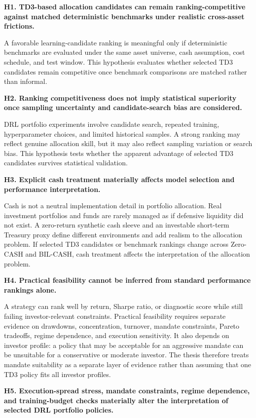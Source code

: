 \documentclass[12pt]{article}
\begin{document}
\textbf{H1. TD3-based allocation candidates can remain ranking-competitive against matched deterministic benchmarks under realistic cross-asset frictions.}

A favorable learning-candidate ranking is meaningful only if deterministic benchmarks are evaluated under the same asset universe, cash assumption, cost schedule, and test window. This hypothesis evaluates whether selected TD3 candidates remain competitive once benchmark comparisons are matched rather than informal.

\textbf{H2. Ranking competitiveness does not imply statistical superiority once sampling uncertainty and candidate-search bias are considered.}

DRL portfolio experiments involve candidate search, repeated training, hyperparameter choices, and limited historical samples. A strong ranking may reflect genuine allocation skill, but it may also reflect sampling variation or search bias. This hypothesis tests whether the apparent advantage of selected TD3 candidates survives statistical validation.

\textbf{H3. Explicit cash treatment materially affects model selection and performance interpretation.}

Cash is not a neutral implementation detail in portfolio allocation. Real investment portfolios and funds are rarely managed as if defensive liquidity did not exist. A zero-return synthetic cash sleeve and an investable short-term Treasury proxy define different environments and add realism to the allocation problem. If selected TD3 candidates or benchmark rankings change across Zero-CASH and BIL-CASH, cash treatment affects the interpretation of the allocation problem.

\textbf{H4. Practical feasibility cannot be inferred from standard performance rankings alone.}

A strategy can rank well by return, Sharpe ratio, or diagnostic score while still failing investor-relevant constraints. Practical feasibility requires separate evidence on drawdowns, concentration, turnover, mandate constraints, Pareto tradeoffs, regime dependence, and execution sensitivity. It also depends on investor profile: a policy that may be acceptable for an aggressive mandate can be unsuitable for a conservative or moderate investor. The thesis therefore treats mandate suitability as a separate layer of evidence rather than assuming that one TD3 policy fits all investor profiles.

\textbf{H5. Execution-spread stress, mandate constraints, regime dependence, and training-budget checks materially alter the interpretation of selected DRL portfolio policies.}
\end{document}
